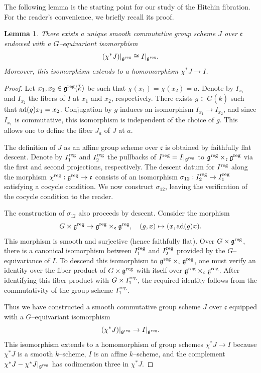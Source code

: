 \documentclass[12pt,english]{smfart}
\numberwithin{equation}{subsection}
\newtheorem{lemma}[equation]{Lemma}
\theoremstyle{remark}
\newcommand\ad{{\rm ad}}
\newcommand\reg{{\rm reg}}
\begin{document}
The following lemma \cite[3.2]{N} is the starting point for our study of the Hitchin fibration. For the reader's convenience, we briefly recall its proof.

\begin{lemma} \label{J}
There exists a unique smooth commutative group scheme $J$ over $\mathfrak{c}$ endowed with a $G$--equivariant isomorphism
$$
(\chi^* J)|_{\mathfrak{g}^\reg} \cong I|_{\mathfrak{g}^\reg}.
$$
Moreover, this isomorphism extends to a homomorphism $\chi^* J \to I$.
\end{lemma}

\begin{proof}
Let $x_1,x_2\in\mathfrak{g}^\reg(\bar{k})$ be such that $\chi(x_1)=\chi(x_2)=a$. Denote by $I_{x_1}$ and $I_{x_2}$ the fibers of $I$ at $x_1$ and $x_2$, respectively. There exists $g\in G(\bar{k})$ such that $\ad(g)x_1=x_2$. Conjugation by $g$ induces an isomorphism $I_{x_1}\to I_{x_2}$, and since $I_{x_1}$ is commutative, this isomorphism is independent of the choice of $g$. This allows one to define the fiber $J_a$ of $J$ at $a$.

The definition of $J$ as an affine group scheme over $\mathfrak{c}$ is obtained by faithfully flat descent. Denote by $I_1^\reg$ and $I_2^\reg$ the pullbacks of $I^\reg=I|_{\mathfrak{g}^\reg}$ to $\mathfrak{g}^\reg\times_\mathfrak{c}\mathfrak{g}^\reg$ via the first and second projections, respectively. The descent datum for $I^\reg$ along the morphism $\chi^\reg:\mathfrak{g}^\reg\to\mathfrak{c}$ consists of an isomorphism $\sigma_{12}:I_2^\reg\to I_1^\reg$ satisfying a cocycle condition. We now construct $\sigma_{12}$, leaving the verification of the cocycle condition to the reader.

The construction of $\sigma_{12}$ also proceeds by descent. Consider the morphism
$$
G\times \mathfrak{g}^\reg \to \mathfrak{g}^\reg\times_\mathfrak{c}\mathfrak{g}^\reg,\quad (g,x)\mapsto (x,\ad(g)x).
$$
This morphism is smooth and surjective (hence faithfully flat). Over $G\times \mathfrak{g}^\reg$, there is a canonical isomorphism between $I_1^\reg$ and $I_2^\reg$ provided by the $G$--equivariance of $I$. To descend this isomorphism to $\mathfrak{g}^\reg\times_\mathfrak{c}\mathfrak{g}^\reg$, one must verify an identity over the fiber product of $G\times \mathfrak{g}^\reg$ with itself over $\mathfrak{g}^\reg\times_\mathfrak{c}\mathfrak{g}^\reg$. After identifying this fiber product with $G\times I_1^\reg$, the required identity follows from the commutativity of the group scheme $I_1^\reg$.

Thus we have constructed a smooth commutative group scheme $J$ over $\mathfrak{c}$ equipped with a $G$--equivariant isomorphism
$$
(\chi^*J)|_{\mathfrak{g}^\reg}\to I|_{\mathfrak{g}^\reg}.
$$
This isomorphism extends to a homomorphism of group schemes $\chi^* J\to I$ because $\chi^*J$ is a smooth $k$--scheme, $I$ is an affine $k$--scheme, and the complement $\chi^*J-\chi^*J|_{\mathfrak{g}^\reg}$ has codimension three in $\chi^*J$.
\end{proof}
\end{document}
